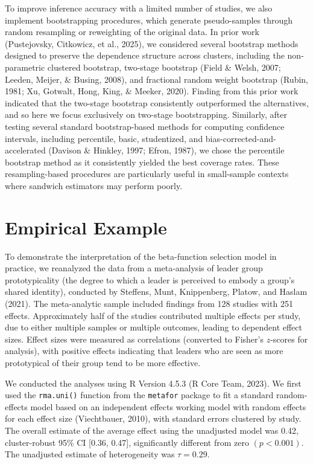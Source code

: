 \documentclass[
  american,
  man, donotrepeattitle,floatsintext]{apa7}
\begin{document}
To improve inference accuracy with a limited number of studies, we also implement bootstrapping procedures, which generate pseudo-samples through random resampling or reweighting of the original data.
In prior work (Pustejovsky, Citkowicz, et al., 2025), we considered several bootstrap methods designed to preserve the dependence structure across clusters, including the non-parametric clustered bootstrap, two-stage bootstrap (Field \& Welsh, 2007; Leeden, Meijer, \& Busing, 2008), and fractional random weight bootstrap (Rubin, 1981; Xu, Gotwalt, Hong, King, \& Meeker, 2020).
Finding from this prior work indicated that the two-stage bootstrap consistently outperformed the alternatives, and so here we focus exclusively on two-stage bootstrapping.
Similarly, after testing several standard bootstrap-based methods for computing confidence intervals, including percentile, basic, studentized, and bias-corrected-and-accelerated (Davison \& Hinkley, 1997; Efron, 1987), we chose the percentile bootstrap method as it consistently yielded the best coverage rates.
These resampling-based procedures are particularly useful in small-sample contexts where sandwich estimators may perform poorly.

\section{Empirical Example}\label{empirical-example}

To demonstrate the interpretation of the beta-function selection model in practice, we reanalyzed the data from a meta-analysis of leader group prototypicality (the degree to which a leader is perceived to embody a group's shared identity), conducted by Steffens, Munt, Knippenberg, Platow, and Haslam (2021). The meta-analytic sample included findings from 128 studies with 251 effects. Approximately half of the studies contributed multiple effects per study, due to either multiple samples or multiple outcomes, leading to dependent effect sizes. Effect sizes were measured as correlations (converted to Fisher's \(z\)-scores for analysis), with positive effects indicating that leaders who are seen as more prototypical of their group tend to be more effective.

We conducted the analyses using R Version 4.5.3 (R Core Team, 2023).
We first used the \texttt{rma.uni()} function from the \texttt{metafor} package to fit a standard random-effects model based on an independent effects working model with random effects for each effect size (Viechtbauer, 2010), with standard errors clustered by study.
The overall estimate of the average effect using the unadjusted model was 0.42, cluster-robust 95\% CI {[}0.36, 0.47{]}, significantly different from zero \((p <0.001)\).
The unadjusted estimate of heterogeneity was \(\tau = 0.29\).
\end{document}
